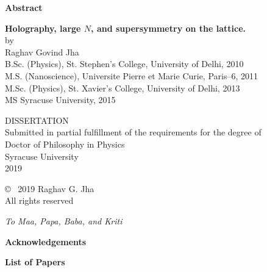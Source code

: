 \newpage

\thispagestyle{empty}
\begin{center}
{\bf\Large Abstract}\\[0.5em]
\end{center}

\begin{quote}
\end{quote}

\newpage
\thispagestyle{empty}

\begin{center}
{\bf\LARGE Holography, large $N$, and supersymmetry on the lattice.}\\
[3em]
 by\\[1em]
{\large Raghav Govind Jha\\[1em]
B.Sc. (Physics), St. Stephen's College, University of Delhi, 2010\\
M.S. (Nanoscience), Universite Pierre et Marie Curie, Paris--6, 2011\\
M.Sc. (Physics), St. Xavier's College, University of Delhi, 2013 \\ 
MS Syracuse University, 2015 \\  [7em]}
\end{center}

\begin{center}
DISSERTATION\\
Submitted in partial fulfillment of the requirements for the degree of\\
Doctor of Philosophy in Physics\\[7em]
Syracuse University\\
{ 2019}\\[5em]

\end{center}

\newpage
\thispagestyle{empty}
\begin{center}
\vspace*{3in}
\copyright ~ 2019 Raghav G. Jha\\[1.5em]
All rights reserved
\end{center}


\newpage
\thispagestyle{empty}
\clearpage
\vspace*{1in}
\begin{center}
{\em To Maa, Papa, Baba, and Kriti} \\
	\vspace{2 cm}
	\vspace{5 cm}
\end{center}
\clearpage

\newpage 




\begin{center}
{\bf\Large Acknowledgements}\\[0.5em]
\end{center}

        

\newpage

\begin{center}
	{\bf\Large List of Papers}
\end{center}


   
\newpage
    \tableofcontents

 
\newpage    \listoffigures
\newpage    \listoftables

\newpage
